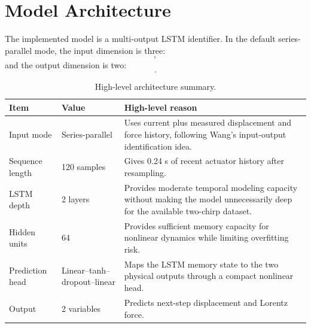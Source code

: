 \documentclass[11pt]{article}
\begin{document}
\section{Model Architecture}
The implemented model is a multi-output LSTM identifier. In the default series-parallel mode, the input dimension is three:
\begin{equation}
[I(k),x(k),F(k)],
\end{equation}
and the output dimension is two:
\begin{equation}
[\hat{x}(k+1),\hat{F}(k+1)].
\end{equation}

\begin{table}[H]
\centering
\small
\begin{tabular}{p{4cm}p{3cm}p{7cm}}
\toprule
Item & Value & High-level reason \\
\midrule
Input mode & Series-parallel & Uses current plus measured displacement and force history, following Wang's input-output identification idea. \\
Sequence length & 120 samples & Gives 0.24 s of recent actuator history after resampling. \\
LSTM depth & 2 layers & Provides moderate temporal modeling capacity without making the model unnecessarily deep for the available two-chirp dataset. \\
Hidden units & 64 & Provides sufficient memory capacity for nonlinear dynamics while limiting overfitting risk. \\
Prediction head & Linear--tanh--dropout--linear & Maps the LSTM memory state to the two physical outputs through a compact nonlinear head. \\
Output & 2 variables & Predicts next-step displacement and Lorentz force. \\
\bottomrule
\end{tabular}
\caption{High-level architecture summary.}
\label{tab:arch_summary}
\end{table}
\end{document}
